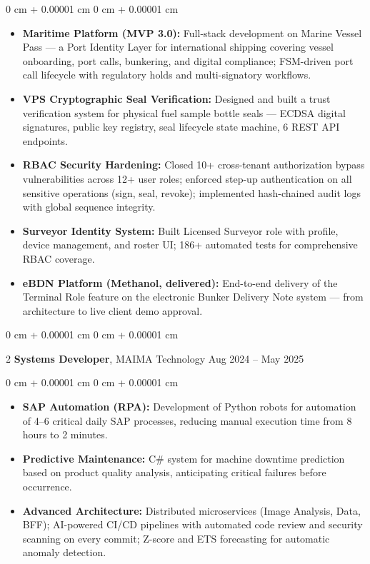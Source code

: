 \documentclass[10pt, letterpaper]{article}
\newenvironment{highlights}{ \begin{itemize}[ topsep=0.10 cm, parsep=0.10 cm, partopsep=0pt,
itemsep=0pt, leftmargin=0 cm + 10pt ] }{ \end{itemize} } %
\newenvironment{onecolentry}{ \begin{adjustwidth}{ 0 cm + 0.00001 cm }{ 0 cm + 0.00001 cm }
}{ \end{adjustwidth} } %
\newenvironment{twocolentry}[2][]{ \onecolentry \def\secondColumn{#2} \setcolumnwidth{\fill, 4.5 cm}
\begin{paracol}{2} }{ \switchcolumn \raggedleft \secondColumn \end{paracol}
\endonecolentry } %
\begin{document}
	\vspace{0.10 cm}
	\begin{onecolentry}
		\begin{highlights}
			\item \textbf{Maritime Platform (MVP 3.0):} Full-stack development on Marine Vessel Pass --- a Port Identity Layer for international shipping covering vessel onboarding, port calls, bunkering, and digital compliance; FSM-driven port call lifecycle with regulatory holds and multi-signatory workflows.
            \item \textbf{VPS Cryptographic Seal Verification:} Designed and built a trust verification system for physical fuel sample bottle seals --- ECDSA digital signatures, public key registry, seal lifecycle state machine, 6 REST API endpoints.
            \item \textbf{RBAC Security Hardening:} Closed 10+ cross-tenant authorization bypass vulnerabilities across 12+ user roles; enforced step-up authentication on all sensitive operations (sign, seal, revoke); implemented hash-chained audit logs with global sequence integrity.
            \item \textbf{Surveyor Identity System:} Built Licensed Surveyor role with profile, device management, and roster UI; 186+ automated tests for comprehensive RBAC coverage.
			\item \textbf{eBDN Platform (Methanol, delivered):} End-to-end delivery of the Terminal Role feature on the electronic Bunker Delivery Note system --- from architecture to live client demo approval.
		\end{highlights}
	\end{onecolentry}

	\vspace{0.2 cm}

	\begin{twocolentry}
		{ Aug 2024 -- May 2025 } \textbf{Systems Developer}, MAIMA Technology
	\end{twocolentry}

	\vspace{0.10 cm}
	\begin{onecolentry}
		\begin{highlights}
			\item \textbf{SAP Automation (RPA):} Development of Python robots for automation of 4--6 critical daily SAP processes, reducing manual execution time from 8 hours to 2 minutes.
			\item \textbf{Predictive Maintenance:} C\# system for machine downtime prediction based on product quality analysis, anticipating critical failures before occurrence.
            \item \textbf{Advanced Architecture:} Distributed microservices (Image Analysis, Data, BFF); AI-powered CI/CD pipelines with automated code review and security scanning on every commit; Z-score and ETS forecasting for automatic anomaly detection.
		\end{highlights}
	\end{onecolentry}
\end{document}
